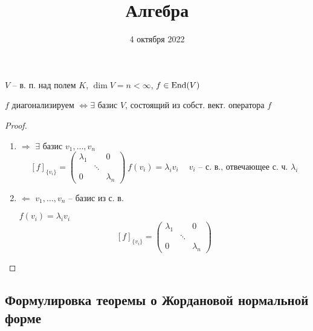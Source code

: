 


    \title{Алгебра}
    \date{4 октября 2022}
    \maketitle

    \pagebreak

    \begin{theorem}
        $V$ -- в. п. над полем $K$, $\dim V = n < \infty$, $f \in \operatorname{End}(V)$
        \par $f$ диагонализируем $\Leftrightarrow \exists$ базис $V$, состоящий из собст. вект. оператора $f$
    \end{theorem}
    \begin{proof}
        $ $
        \begin{enumerate}
            \item{$\Rightarrow$} $\exists$ базис $v_1, \dots, v_n$
                \[
                    [f]_{\{v_i\}} = \begin{pmatrix}
                        \lambda_1 & & 0 \\
                         & \ddots & \\
                        0 & & \lambda_n
                    \end{pmatrix} \ f(v_i) = \lambda_iv_i \ \quad v_i \text{ -- с. в., отвечающее с. ч. } \lambda_i
                \]
            \item{$\Leftarrow$} $v_1, \dots, v_n$ -- базис из с. в.
                \par $f(v_i) = \lambda_i v_i$
                \[
                    [f]_{\{v_i\}} = \begin{pmatrix}
                        \lambda_1 & & 0 \\
                         & \ddots & \\
                         0 & & \lambda_n
                    \end{pmatrix}    
                \]
        \end{enumerate}
    \end{proof}

    \subsection*{Формулировка теоремы о Жордановой нормальной форме}

